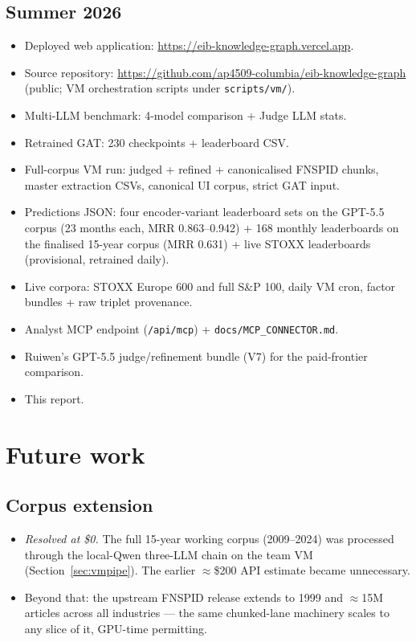 \documentclass[11pt]{article}
\begin{document}
\subsection{Summer 2026}
\begin{itemize}
  \item Deployed web application: \url{https://eib-knowledge-graph.vercel.app}.
  \item Source repository: \url{https://github.com/ap4509-columbia/eib-knowledge-graph} (public; VM orchestration scripts under \texttt{scripts/vm/}).
  \item Multi-LLM benchmark: 4-model comparison + Judge LLM stats.
  \item Retrained GAT: 230 checkpoints + leaderboard CSV.
  \item Full-corpus VM run: judged + refined + canonicalised FNSPID chunks, master extraction CSVs, canonical UI corpus, strict GAT input.
  \item Predictions JSON: four encoder-variant leaderboard sets on the GPT-5.5 corpus (23 months each, MRR 0.863--0.942) + 168 monthly leaderboards on the finalised 15-year corpus (MRR 0.631) + live STOXX leaderboards (provisional, retrained daily).
  \item Live corpora: STOXX Europe 600 and full S\&P 100, daily VM cron, factor bundles + raw triplet provenance.
  \item Analyst MCP endpoint (\texttt{/api/mcp}) + \texttt{docs/MCP\_CONNECTOR.md}.
  \item Ruiwen's GPT-5.5 judge/refinement bundle (V7) for the paid-frontier comparison.
  \item This report.
\end{itemize}

\section{Future work}

\subsection{Corpus extension}
\begin{itemize}
  \item \emph{Resolved at \$0.} The full 15-year working corpus (2009--2024) was processed through the local-Qwen three-LLM chain on the team VM (Section~\ref{sec:vmpipe}). The earlier \(\approx\)\$200 API estimate became unnecessary.
  \item Beyond that: the upstream FNSPID release extends to 1999 and \(\approx\)15M articles across all industries --- the same chunked-lane machinery scales to any slice of it, GPU-time permitting.
\end{itemize}
\end{document}
